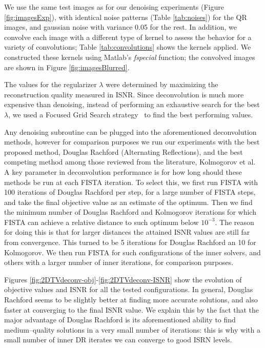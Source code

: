 \documentclass[twoside,11pt]{article}
\numberwithin{equation}{section}
\numberwithin{theorem}{section}
\begin{document}
We use the same test images as for our denoising experiments (Figure \ref{fig:imagesExp}), with identical noise patterns (Table \ref{tab:noises}) for the QR images, and gaussian noise with variance 0.05 for the rest. In addition, we convolve each image with a different type of kernel to assess the behavior for a variety of convolutions; Table \ref{tab:convolutions} shows the kernels applied. We constructed these kernels using Matlab's {\it fspecial} function; the convolved images are shown in Figure \ref{fig:imagesBlurred}.

The values for the regularizer $\lambda$ were determined by maximizing the reconstruction quality measured in ISNR. Since deconvolution is much more expensive than denoising, instead of performing an exhaustive search for the best $\lambda$, we used a Focused Grid Search strategy~\citep{HAIS07,NeurocomputingRejilla} to find the best performing values.

Any denoising subroutine can be plugged into the aforementioned deconvolution methods, however for comparison purposes we run our experiments with the best proposed method, Douglas Rachford (Alternating Reflections), and the best competing method among those reviewed from the literature, Kolmogorov et al. A key parameter in deconvolution performance is for how long should these methods be run at each FISTA iteration. To select this, we first run FISTA with 100 iterations of Douglas Rachford per step, for a large number of FISTA steps, and take the final objective value as an estimate of the optimum. Then we find the minimum number of Douglas Rachford and Kolmogorov iterations for which FISTA can achieve a relative distance to such optimum below $10^{-3}$. The reason for doing this is that for larger distances the attained ISNR values are still far from convergence. This turned to be 5 iterations for Douglas Rachford an 10 for Kolmogorov. We then run FISTA for such configurations of the inner solvers, and others with a larger number of inner iterations, for comparison
purposes.

Figures \ref{fig:2DTVdeconv-obj}-\ref{fig:2DTVdeconv-ISNR} show the evolution of objective values and ISNR for all the tested configurations. In general, Douglas Rachford seems to be slightly better at finding more accurate solutions, and also faster at converging to the final ISNR value. We explain this by the fact that the major advantage of Douglas Rachford is its aforementioned ability to find medium--quality solutions in a very small number of iterations: this is why with a small number of inner DR iterates we can converge to good ISRN levels.
\end{document}
